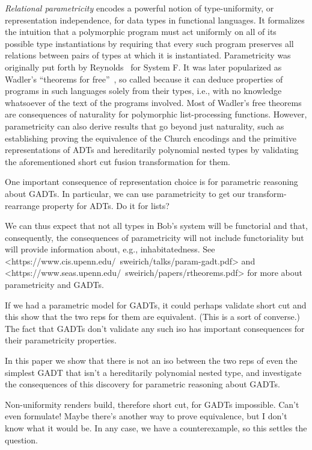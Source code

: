 \documentclass[acmsmall,screen,review,anonymous]{acmart}
\theoremstyle{definition}
\begin{document}
{\em Relational parametricity} encodes a powerful notion of
type-uniformity, or representation independence, for data types in
functional languages. It formalizes the intuition that a polymorphic
program must act uniformly on all of its possible type instantiations
by requiring that every such program preserves all relations between
pairs of types at which it is instantiated. Parametricity was
originally put forth by Reynolds~\cite{rey83} for System F. It was
later popularized as Wadler's ``theorems for free''~\cite{wad89}, so
called because it can deduce properties of programs in such languages
solely from their types, i.e., with no knowledge whatsoever of the
text of the programs involved.  Most of Wadler's free theorems are
consequences of naturality for polymorphic list-processing
functions. However, parametricity can also derive results that go
beyond just naturality, such as establishing {\color{blue} proving}
the equivalence of the Church encodings and the primitive
representations of ADTs and {\color{blue} hereditarily polynomial}
nested types by validating the aforementioned short cut fusion
transformation for them.


One important consequence of representation choice is for parametric
reasoning about GADTs. In particular, we can use parametricity to get
our transform-rearrange property for ADTs. Do it for lists?



We can thus expect that not all types in Bob's system will
be functorial and that, consequently, the consequences of
parametricity will not include functoriality but will provide
information about, e.g., inhabitatedness.  See
<https://www.cis.upenn.edu/~sweirich/talks/param-gadt.pdf> and
<https://www.seas.upenn.edu/~sweirich/papers/rtheorems.pdf> for more
about parametricity and GADTs.


If we had a parametric model for GADTs, it could perhaps validate
short cut and this show that the two reps for them are equivalent.
(This is a sort of converse.)
The fact that GADTs don't validate any such iso has important
consequences for their parametricity properties. 
  
In this paper we show that there is not an iso between the two reps of
even the simplest GADT {\color{blue} that isn't a hereditarily
  polynomial nested type}, and investigate the consequences of this
discovery for parametric reasoning about GADTs.


Non-uniformity renders build, therefore short cut, for GADTs
impossible. Can't even formulate! Maybe there's another way to prove
equivalence, but I don't know what it would be. In any case, we have a
counterexample, so this settles the question.
\end{document}
